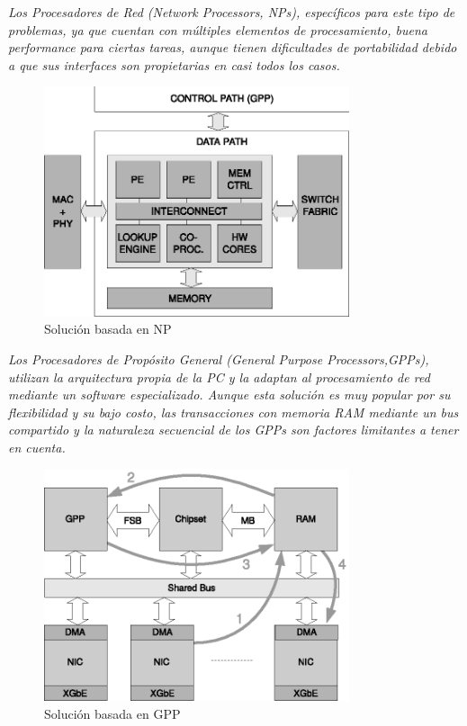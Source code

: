 \emph{Los Procesadores de Red (Network Processors, NPs), específicos para este tipo de problemas, ya que cuentan con múltiples elementos de procesamiento, buena performance para ciertas tareas, aunque tienen dificultades de portabilidad debido a que sus interfaces son propietarias en casi todos los casos.}
\begin{figure}[h]
  \centering
      \includegraphics[width=0.8\textwidth]{1-introduccion/graf/NP_based.eps}
  \caption{Solución basada en NP}
  \label{fig:diseno}
\end{figure}
\newpage

\emph{Los Procesadores de Propósito General (General Purpose Processors,GPPs), utilizan la arquitectura propia de la PC y la adaptan al procesamiento de red mediante un software especializado. Aunque esta solución es muy popular por su flexibilidad y su bajo costo, las transacciones con memoria RAM mediante un bus compartido y la naturaleza secuencial de los GPPs son factores limitantes a tener en cuenta. }
 \begin{figure}[h]
  \centering
      \includegraphics[width=0.8\textwidth]{1-introduccion/graf/GPP_based.eps}
  \caption{Solución basada en GPP}
  \label{fig:diseno}
\end{figure}


